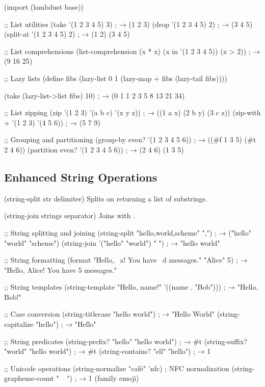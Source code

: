 \begin{example}
\begin{lambdustcode}
(import (lambdust base))

;; List utilities
(take '(1 2 3 4 5) 3)        ; → (1 2 3)
(drop '(1 2 3 4 5) 2)        ; → (3 4 5)
(split-at '(1 2 3 4 5) 2)    ; → (1 2) (3 4 5)

;; List comprehensions
(list-comprehension (x * x) (x in '(1 2 3 4 5)) (x > 2))
; → (9 16 25)

;; Lazy lists
(define fibs
  (lazy-list 0 1 (lazy-map + fibs (lazy-tail fibs))))

(take (lazy-list->list fibs) 10)
; → (0 1 1 2 3 5 8 13 21 34)

;; List zipping
(zip '(1 2 3) '(a b c) '(x y z))     ; → ((1 a x) (2 b y) (3 c z))
(zip-with + '(1 2 3) '(4 5 6))      ; → (5 7 9)

;; Grouping and partitioning  
(group-by even? '(1 2 3 4 5 6))     ; → ((#f 1 3 5) (#t 2 4 6))
(partition even? '(1 2 3 4 5 6))    ; → (2 4 6) (1 3 5)
\end{lambdustcode}
\end{example}

\subsection{Enhanced String Operations}
\label{subsec:enhanced-strings}

\begin{procspec}{(string-split str delimiter)}
Splits  on  returning a list of substrings.
\end{procspec}

\begin{procspec}{(string-join strings separator)}
Joins  with .
\end{procspec}

\begin{example}
\begin{lambdustcode}
;; String splitting and joining
(string-split "hello,world,scheme" ",")  ; → ("hello" "world" "scheme")
(string-join '("hello" "world") " ")     ; → "hello world"

;; String formatting
(format "Hello, ~a! You have ~d messages." "Alice" 5)
; → "Hello, Alice! You have 5 messages."

;; String templates
(string-template "Hello, {name}!" '((name . "Bob")))
; → "Hello, Bob!"

;; Case conversion
(string-titlecase "hello world")         ; → "Hello World"
(string-capitalize "hello")              ; → "Hello"

;; String predicates
(string-prefix? "hello" "hello world")   ; → #t
(string-suffix? "world" "hello world")   ; → #t
(string-contains? "ell" "hello")         ; → 1

;; Unicode operations
(string-normalize "café" 'nfc)           ; NFC normalization
(string-grapheme-count "👨‍👩‍👧‍👦")           ; → 1 (family emoji)
\end{lambdustcode}
\end{example}

